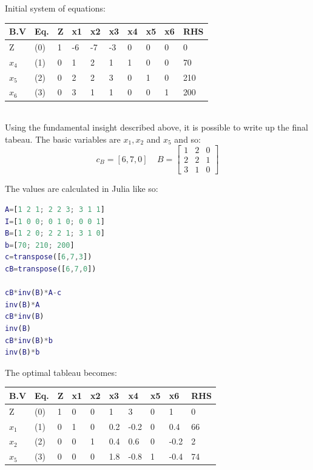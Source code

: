\documentclass{article}
\begin{document}
\vspace{5mm}
Initial system of equations:

\vspace{5mm}
\begin{tabular}{|l|l|l|l l l l l l|l|}
  \hline
  B.V           & Eq. & Z & x1 & x2 & x3 & x4 & x5 & x6 & RHS \\ \hline
  Z             & (0) & 1 & -6 & -7 & -3 & 0  & 0  & 0  & 0   \\ \hline
  $x_4$            & (1) & 0 & 1  & 2  & 1  & 1  & 0  & 0  & 70  \\ \hline
  $x_5$            & (2) & 0 & 2  & 2  & 3  & 0  & 1  & 0  & 210 \\ \hline
  $x_6$            & (3) & 0 & 3  & 1  & 1  & 0  & 0  & 1  & 200 \\ \hline
\end{tabular}
\vspace{5mm}
\\
Using the fundamental insight described above, it is possible to write up the final tabeau. 
The basic variables are $x_1, x_2$ and $x_5$ and so:
\[c_B=[6, 7, 0] \ \ \ \ \ B=
\begin{bmatrix}
  1 & 2 & 0 \\
  2 & 2 & 1 \\
  3 & 1 & 0
\end{bmatrix}
\]

\pagebreak
The values are calculated in Julia like so:

\vspace{5mm}
\begin{file}[Project 1.jl]
	\begin{lstlisting}[language=matlab]
A=[1 2 1; 2 2 3; 3 1 1]
I=[1 0 0; 0 1 0; 0 0 1]
B=[1 2 0; 2 2 1; 3 1 0]
b=[70; 210; 200]
c=transpose([6,7,3])
cB=transpose([6,7,0])
   
cB*inv(B)*A-c
inv(B)*A
cB*inv(B)
inv(B)
cB*inv(B)*b
inv(B)*b    
	\end{lstlisting}
\end{file}


\vspace{5mm}
The optimal tableau becomes:

\vspace{5mm}
\begin{tabular}{|l|l|l|l l l l l l|l|}
  \hline
  B.V           & Eq. & Z & x1 & x2 & x3 & x4 & x5 & x6 & RHS \\ \hline
  Z             & (0) & 1 & 0 & 0 & 1 & 3 & 0 & 1 & 0   \\ \hline
  $x_1$            & (1) & 0 & 1 & 0 & 0.2 & -0.2 & 0 & 0.4 & 66  \\ \hline
  $x_2$            & (2) & 0 & 0 & 1 & 0.4 & 0.6 & 0 & -0.2 & 2 \\ \hline
  $x_5$           & (3) & 0 & 0 & 0 & 1.8 & -0.8 & 1 & -0.4 & 74 \\ \hline
\end{tabular}
\end{document}

